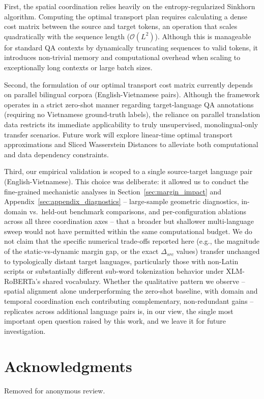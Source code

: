 \documentclass[11pt]{article}
\begin{document}
First, the spatial coordination relies heavily on the entropy-regularized Sinkhorn algorithm. Computing the optimal transport plan requires calculating a dense cost matrix between the source and target tokens, an operation that scales quadratically with the sequence length ($\mathcal{O}(L^2)$). Although this is manageable for standard QA contexts by dynamically truncating sequences to valid tokens, it introduces non-trivial memory and computational overhead when scaling to exceptionally long contexts or large batch sizes. 

Second, the formulation of our optimal transport cost matrix currently depends on parallel bilingual corpora (English-Vietnamese pairs). Although the framework operates in a strict zero-shot manner regarding target-language QA annotations (requiring no Vietnamese ground-truth labels), the reliance on parallel translation data restricts its immediate applicability to truly unsupervised, monolingual-only transfer scenarios. Future work will explore linear-time optimal transport approximations and Sliced Wasserstein Distances to alleviate both computational and data dependency constraints.

Third, our empirical validation is scoped to a single source-target language pair (English-Vietnamese). This choice was deliberate: it allowed us to conduct the fine-grained mechanistic analyses in Section~\ref{sec:margin_impact} and Appendix~\ref{sec:appendix_diagnostics} -- large-sample geometric diagnostics, in-domain vs.\ held-out benchmark comparisons, and per-configuration ablations across all three coordination axes -- that a broader but shallower multi-language sweep would not have permitted within the same computational budget. We do not claim that the specific numerical trade-offs reported here (e.g., the magnitude of the static-vs-dynamic margin gap, or the exact $\Delta_{src}$ values) transfer unchanged to typologically distant target languages, particularly those with non-Latin scripts or substantially different sub-word tokenization behavior under XLM-RoBERTa's shared vocabulary. Whether the qualitative pattern we observe -- spatial alignment alone underperforming the zero-shot baseline, with domain and temporal coordination each contributing complementary, non-redundant gains -- replicates across additional language pairs is, in our view, the single most important open question raised by this work, and we leave it for future investigation.

\section*{Acknowledgments}
Removed for anonymous review.
\end{document}
